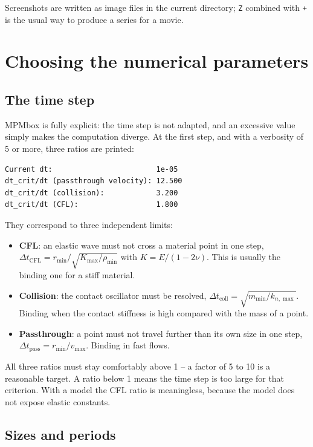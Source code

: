 \documentclass[a4paper,onecolumn,11pt]{doofus}
\begin{document}
Screenshots are written as image files in the current directory; \texttt{Z} combined with
\texttt{+} is the usual way to produce a series for a movie.


\section{Choosing the numerical parameters}
\label{sec:timestep}

\subsection{The time step}

MPMbox is fully explicit: the time step is not adapted, and an excessive value simply makes the
computation diverge. At the first step, and with a verbosity of 5 or more, three ratios are
printed:

\begin{lstlisting}[style=mystyle,numbers=none]
Current dt:                        1e-05
dt_crit/dt (passthrough velocity): 12.500
dt_crit/dt (collision):            3.200
dt_crit/dt (CFL):                  1.800
\end{lstlisting}

They correspond to three independent limits:

\begin{itemize}
\item \textbf{CFL}: an elastic wave must not cross a material point in one step,
      $\Delta t_{\text{CFL}} = r_{\min} / \sqrt{K_{\max}/\rho_{\min}}$ with
      $K = E / (1-2\nu)$. This is usually the binding one for a stiff material.
\item \textbf{Collision}: the contact oscillator must be resolved,
      $\Delta t_{\text{coll}} = \sqrt{m_{\min}/k_{n,\max}}$. Binding when the contact stiffness
      is high compared with the mass of a point.
\item \textbf{Passthrough}: a point must not travel further than its own size in one step,
      $\Delta t_{\text{pass}} = r_{\min} / v_{\max}$. Binding in fast flows.
\end{itemize}

All three ratios must stay comfortably above 1 -- a factor of 5 to 10 is a reasonable target.
A ratio below 1 means the time step is too large for that criterion. With a
 model the CFL ratio is meaningless, because the model does not expose
elastic constants.

\subsection{Sizes and periods}
\end{document}
